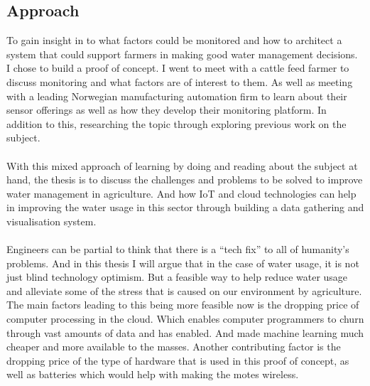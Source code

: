 \documentclass[]{uiophd}
\begin{document}
\subsection{Approach}
To gain insight in to what factors could be monitored and how to architect a system that could support farmers in making good water management decisions. I chose to build a proof of concept. I went to meet with a cattle feed farmer to discuss monitoring and what factors are of interest to them. As well as meeting with a leading Norwegian manufacturing automation firm to learn about their sensor offerings as well as how they develop their monitoring platform. In addition to this, researching the topic through exploring previous work on the subject.
\\\\
With this mixed approach of learning by doing and reading about the subject at hand, the thesis is to discuss the challenges and problems to be solved to improve water management in agriculture. And how IoT and cloud technologies can help in improving the water usage in this sector through building a data gathering and visualisation system.
\\\\
Engineers can be partial to think that there is a “tech fix” to all of humanity's problems. And in this thesis I will argue that in the case of water usage, it is not just blind technology optimism. But a feasible way to help reduce water usage and alleviate some of the stress that is caused on our environment by agriculture. The main factors leading to this being more feasible now is the dropping price of computer processing in the cloud. Which enables computer programmers to churn through vast amounts of data and has enabled. And made machine learning much cheaper and more available to the masses. Another contributing factor is the dropping price of the type of hardware that is used in this proof of concept, as well as batteries which would help with making the motes wireless.
\end{document}
